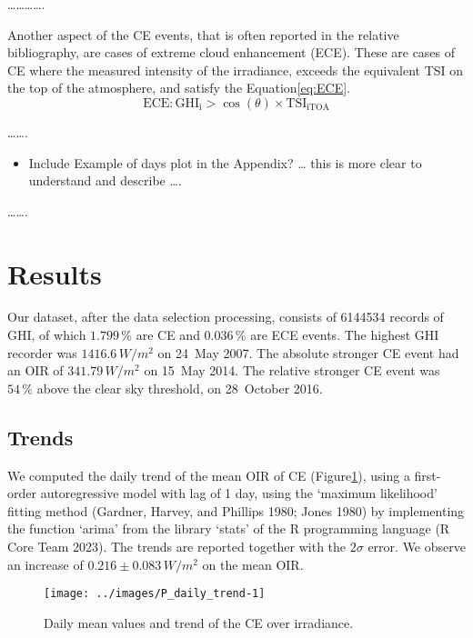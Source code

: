 \documentclass[
]{article}
\providecommand{\tightlist}{%
  \setlength{\itemsep}{0pt}\setlength{\parskip}{0pt}}
\begin{document}
\ldots\ldots\ldots\ldots.

Another aspect of the CE events, that is often reported in the relative bibliography,
are cases of extreme cloud enhancement (ECE). These are cases of CE where the
measured intensity of the irradiance, exceeds the equivalent TSI on the top of the
atmosphere, and satisfy the Equation\nobreakspace{}\ref{eq:ECE}.
\begin{equation}
\text{ECE}: \text{GHI}_\text{i} > \cos(\theta) \times \text{TSI}_\text{iTOA}
\label{eq:ECE}
\end{equation}

\ldots\ldots.

\begin{itemize}
\tightlist
\item
  Include Example of days plot in the Appendix?
  \ldots{} this is more clear to understand and describe \ldots.
\end{itemize}

\ldots\ldots.

\FloatBarrier

\hypertarget{results}{%
\section{Results}\label{results}}

Our dataset, after the data selection processing, consists of
6144534 records of GHI, of which
\(1.799\,\%\) are CE and
\(0.036\,\%\) are ECE events.
The highest GHI recorder was
\(1416.6\,W/m^2\)
on 24~May 2007.
The absolute stronger CE event had an OIR of
\(341.79\,W/m^2\) on
15~May 2014.
The relative stronger CE event was
\(54\,\%\) above the
clear sky threshold, on
28~October 2016.

\hypertarget{trends}{%
\subsection{Trends}\label{trends}}

We computed the daily trend of the mean OIR of CE
(Figure\nobreakspace{}\ref{fig:CEmeanDaily}), using a first-order autoregressive
model with lag of 1 day, using the `maximum likelihood' fitting method (Gardner, Harvey, and Phillips 1980; Jones 1980) by implementing the function `arima' from the library `stats' of the R
programming language (R Core Team 2023). The trends are reported together with the \(2\sigma\)
error. We observe an increase of
\(0.216\pm 0.083\,W/m^2\)
on the mean OIR.

\begin{figure}[h!]

{\centering \texttt{[image: ../images/P\_daily\_trend-1]} 

}

\caption{Daily mean values and trend of the CE over irradiance.}\label{fig:CEmeanDaily}
\end{figure}
\end{document}
